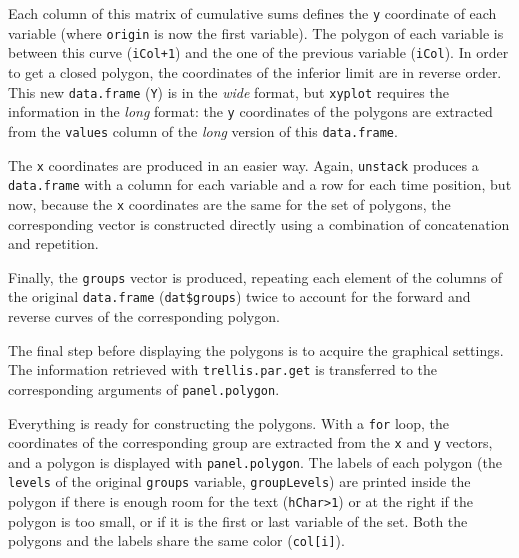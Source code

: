\documentclass[smallroyalvopaper]{memoir}
\begin{document}
Each column of this matrix of cumulative sums defines the \texttt{y}
coordinate of each variable (where \texttt{origin} is now the first
variable). The polygon of each variable is between this curve
(\texttt{iCol+1}) and the one of the previous variable (\texttt{iCol}). In order to
get a closed polygon, the coordinates of the inferior limit are in
reverse order. This new \texttt{data.frame} (\texttt{Y}) is in the \emph{wide} format,
but \texttt{xyplot} requires the information in the \emph{long} format: the \texttt{y}
coordinates of the polygons are extracted from the \texttt{values} column of
the \emph{long} version of this \texttt{data.frame}.

The \texttt{x} coordinates are produced in an easier way. Again, \texttt{unstack}
produces a \texttt{data.frame} with a column for each variable and a row
for each time position, but now, because the \texttt{x} coordinates are the same
for the set of polygons, the corresponding vector is constructed
directly using a combination of concatenation and repetition.

Finally, the \texttt{groups} vector is produced, repeating each element of
the columns of the original \texttt{data.frame} (\texttt{dat\$groups}) twice to
account for the forward and reverse curves of the corresponding
polygon.

The final step before displaying the polygons is to acquire the
graphical settings. The information retrieved with
\texttt{trellis.par.get} is transferred to the corresponding arguments of
\texttt{panel.polygon}.

Everything is ready for constructing the polygons. With a \texttt{for} loop,
the coordinates of the corresponding group are extracted from the \texttt{x}
and \texttt{y} vectors, and a polygon is displayed with \texttt{panel.polygon}. The
labels of each polygon (the \texttt{levels} of the original \texttt{groups}
variable, \texttt{groupLevels}) are printed inside the polygon if there is
enough room for the text (\texttt{hChar>1}) or at the right if the polygon is
too small, or if it is the first or last variable of the set. Both the
polygons and the labels share the same color (\texttt{col[i]}).

\end{document}
